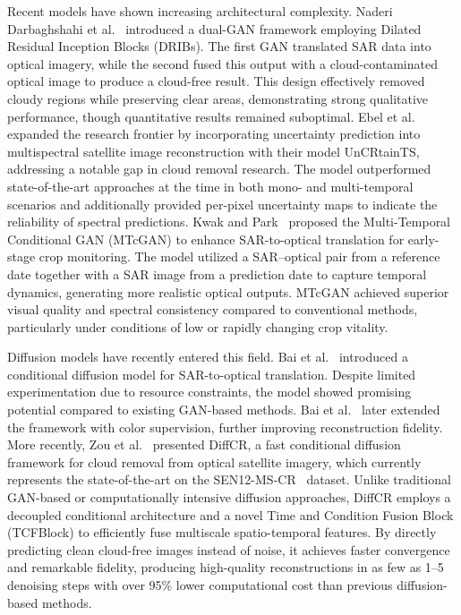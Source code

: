Recent models have shown increasing architectural complexity. Naderi Darbaghshahi et al.~\cite{CR_RS_GAN_s2o} introduced a dual-GAN framework employing Dilated Residual Inception Blocks (DRIBs). The first GAN translated SAR data into optical imagery, while the second fused this output with a cloud-contaminated optical image to produce a cloud-free result. This design effectively removed cloudy regions while preserving clear areas, demonstrating strong qualitative performance, though quantitative results remained suboptimal.
Ebel et al.~\cite{UnCRtainTS} expanded the research frontier by incorporating uncertainty prediction into multispectral satellite image reconstruction with their model UnCRtainTS, addressing a notable gap in cloud removal research. The model outperformed state-of-the-art approaches at the time in both mono- and multi-temporal scenarios and additionally provided per-pixel uncertainty maps to indicate the reliability of spectral predictions.
Kwak and Park~\cite{assessing_MT_cGANS_s2o_crop} proposed the Multi-Temporal Conditional GAN (MTcGAN) to enhance SAR-to-optical translation for early-stage crop monitoring. The model utilized a SAR–optical pair from a reference date together with a SAR image from a prediction date to capture temporal dynamics, generating more realistic optical outputs. MTcGAN achieved superior visual quality and spectral consistency compared to conventional methods, particularly under conditions of low or rapidly changing crop vitality.

Diffusion models have recently entered this field. Bai et al.~\cite{c_diffusion_s2o} introduced a conditional diffusion model for SAR-to-optical translation. Despite limited experimentation due to resource constraints, the model showed promising potential compared to existing GAN-based methods. Bai et al.~\cite{s2o_color_super_diff} later extended the framework with color supervision, further improving reconstruction fidelity. More recently, Zou et al.~\cite{DiffCR} presented DiffCR, a fast conditional diffusion framework for cloud removal from optical satellite imagery, which currently represents the state-of-the-art on the SEN12-MS-CR~\cite{sen12ms-cr_2021} dataset. Unlike traditional GAN-based or computationally intensive diffusion approaches, DiffCR employs a decoupled conditional architecture and a novel Time and Condition Fusion Block (TCFBlock) to efficiently fuse multiscale spatio-temporal features. By directly predicting clean cloud-free images instead of noise, it achieves faster convergence and remarkable fidelity, producing high-quality reconstructions in as few as 1–5 denoising steps with over 95\% lower computational cost than previous diffusion-based methods.

